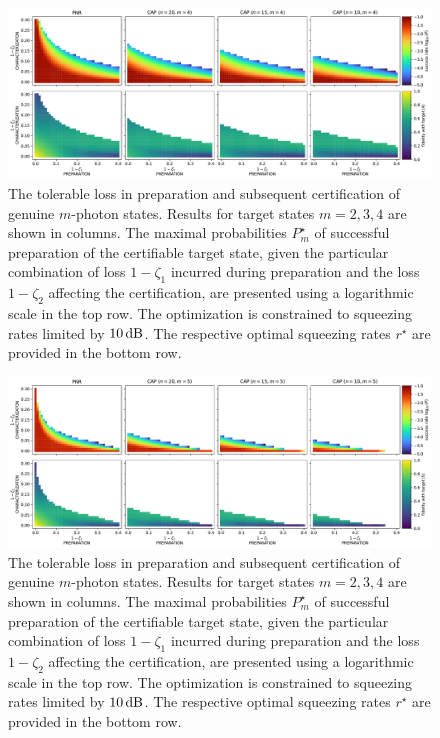 \documentclass{article}
\begin{document}
\begin{figure}[h]
  \begin{center}
    \includegraphics[width = \columnwidth]{import/202411/paper_unified_04.pdf}
  \end{center}
  \caption{
    The tolerable loss in preparation and subsequent certification of genuine $m$-photon states. Results for target states $m = 2, 3, 4$ are shown in columns. The maximal probabilities $P_{m}^{\star}$ of successful preparation of the certifiable target state, given the particular combination of loss $1 - \zeta_{1}$ incurred during preparation and the loss $1 - \zeta_{2}$ affecting the certification, are presented using a logarithmic scale in the top row. The optimization is constrained to squeezing rates limited by $10\,\mathrm{dB}$. The respective optimal squeezing rates $r^{\star}$ are provided in the bottom row.
  }
  \label{f-otm-4}
\end{figure}

\begin{figure}[h]
  \begin{center}
    \includegraphics[width = \columnwidth]{import/202411/paper_unified_05.pdf}
  \end{center}
  \caption{
    The tolerable loss in preparation and subsequent certification of genuine $m$-photon states. Results for target states $m = 2, 3, 4$ are shown in columns. The maximal probabilities $P_{m}^{\star}$ of successful preparation of the certifiable target state, given the particular combination of loss $1 - \zeta_{1}$ incurred during preparation and the loss $1 - \zeta_{2}$ affecting the certification, are presented using a logarithmic scale in the top row. The optimization is constrained to squeezing rates limited by $10\,\mathrm{dB}$. The respective optimal squeezing rates $r^{\star}$ are provided in the bottom row.
  }
  \label{f-otm-5}
\end{figure}
\end{document}
